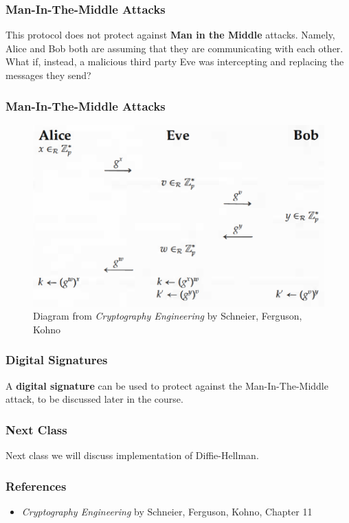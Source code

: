 \documentclass{beamer}
\newcommand{\<}{\langle}
\renewcommand{\>}{\rangle}
\begin{document}
\begin{frame}
\frametitle{Man-In-The-Middle Attacks}

This protocol does not protect against \textbf{Man in the Middle} attacks. Namely, Alice and Bob both are assuming that they are communicating with each other. What if, instead, a malicious third party Eve was intercepting and replacing the messages they send?
\end{frame}


\begin{frame}
\frametitle{Man-In-The-Middle Attacks}

\begin{figure}
\includegraphics[scale=.5]{IMG/mitm}
\vspace{5mm}
\caption{\scriptsize Diagram from \emph{Cryptography Engineering} by Schneier, Ferguson, Kohno}
\end{figure}
\end{frame}


\begin{frame}
\frametitle{Digital Signatures}

A \textbf{digital signature} can be used to protect against the Man-In-The-Middle attack, to be discussed later in the course. 
\end{frame}

\begin{frame}
\frametitle{Next Class}

Next class we will discuss implementation of Diffie-Hellman.
\end{frame}

\begin{frame}
\frametitle{References}

\begin{itemize}
\item \emph{Cryptography Engineering} by Schneier, Ferguson, Kohno, Chapter 11
\end{itemize}
\end{frame}
\end{document}
